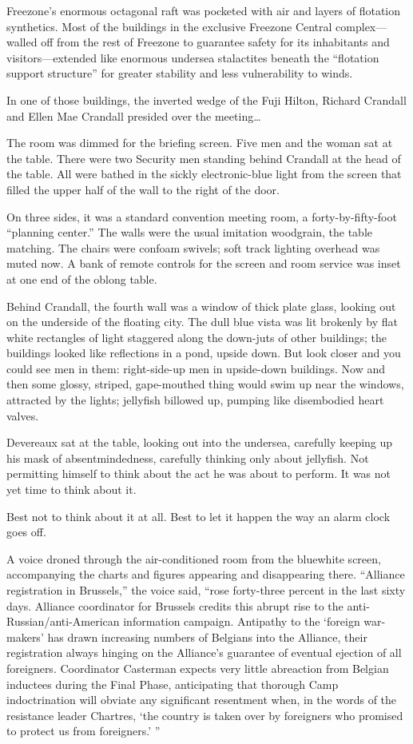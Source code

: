 Freezone's enormous octagonal raft was pocketed with air and layers of flotation synthetics. Most of the buildings in the exclusive Freezone Central complex---walled off from the rest of Freezone to guarantee safety for its inhabitants and visitors---extended like enormous undersea stalactites beneath the ``flotation support structure'' for greater stability and less vulnerability to winds.

In one of those buildings, the inverted wedge of the Fuji Hilton, Richard Crandall and Ellen Mae Crandall presided over the meeting\ldots

The room was dimmed for the briefing screen. Five men and the woman sat at the table. There were two Security men standing behind Crandall at the head of the table. All were bathed in the sickly electronic-blue light from the screen that filled the upper half of the wall to the right of the door.

On three sides, it was a standard convention meeting room, a forty-by-fifty-foot ``planning center.'' The walls were the usual imitation woodgrain, the table matching. The chairs were confoam swivels; soft track lighting overhead was muted now. A bank of remote controls for the screen and room service was inset at one end of the oblong table.

Behind Crandall, the fourth wall was a window of thick plate glass, looking out on the underside of the floating city. The dull blue vista was lit brokenly by flat white rectangles of light staggered along the down-juts of other buildings; the buildings looked like reflections in a pond, upside down. But look closer and you could see men in them: right-side-up men in upside-down buildings. Now and then some glossy, striped, gape-mouthed thing would swim up near the windows, attracted by the lights; jellyfish billowed up, pumping like disembodied heart valves.

Devereaux sat at the table, looking out into the undersea, carefully keeping up his mask of absentmindedness, carefully thinking only about jellyfish. Not permitting himself to think about the act he was about to perform. It was not yet time to think about it.

Best not to think about it at all. Best to let it happen the way an alarm clock goes off.

A voice droned through the air-conditioned room from the bluewhite screen, accompanying the charts and figures appearing and disappearing there. ``Alliance registration in Brussels,'' the voice said, ``rose forty-three percent in the last sixty days. Alliance coordinator for Brussels credits this abrupt rise to the anti-Russian/anti-American information campaign. Antipathy to the ‘foreign war-makers' has drawn increasing numbers of Belgians into the Alliance, their registration always hinging on the Alliance's guarantee of eventual ejection of all foreigners. Coordinator Casterman expects very little abreaction from Belgian inductees during the Final Phase, anticipating that thorough Camp indoctrination will obviate any significant resentment when, in the words of the resistance leader Chartres, ‘the country is taken over by foreigners who promised to protect us from foreigners.' ''

